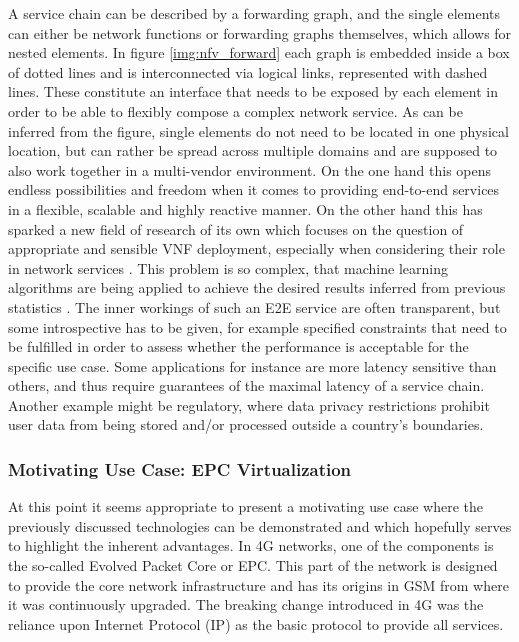 A service chain can be described by a forwarding graph, and the single elements can either be network functions or forwarding graphs themselves, which allows for nested elements. In figure \ref{img:nfv_forward} each graph is embedded inside a box of dotted lines and is interconnected via logical links, represented with dashed lines. These constitute an interface that needs to be exposed by each element in order to be able to flexibly compose a complex network service. As can be inferred from the figure, single elements do not need to be located in one physical location, but can rather be spread across multiple domains and are supposed to also work together in a multi-vendor environment. On the one hand this opens endless possibilities and freedom when it comes to providing end-to-end services in a flexible, scalable and highly reactive manner. On the other hand this has sparked a new field of research of its own which focuses on the question of appropriate and sensible VNF deployment, especially when considering their role in network services \cite{place1} \cite{place2} \cite{place3}. This problem is so complex, that machine learning algorithms are being applied to achieve the desired results inferred from previous statistics \cite{placeml1} \cite{placeml2}. The inner workings of such an E2E service are often transparent, but some introspective has to be given, for example specified constraints that need to be fulfilled in order to assess whether the performance is acceptable for the specific use case. Some applications for instance are more latency sensitive than others, and thus require guarantees of the maximal latency of a service chain. Another example might be regulatory, where data privacy restrictions prohibit user data from being stored and/or processed outside a country's boundaries. 

\subsubsection{Motivating Use Case: EPC Virtualization}
At this point it seems appropriate to present a motivating use case where the previously discussed technologies can be demonstrated and which hopefully serves to highlight the inherent advantages. In 4G networks, one of the components is the so-called Evolved Packet Core or EPC. This part of the network is designed to provide the core network infrastructure and has its origins in GSM from where it was continuously upgraded. The breaking change introduced in 4G was the reliance upon Internet Protocol (IP) as the basic protocol to provide all services. 

